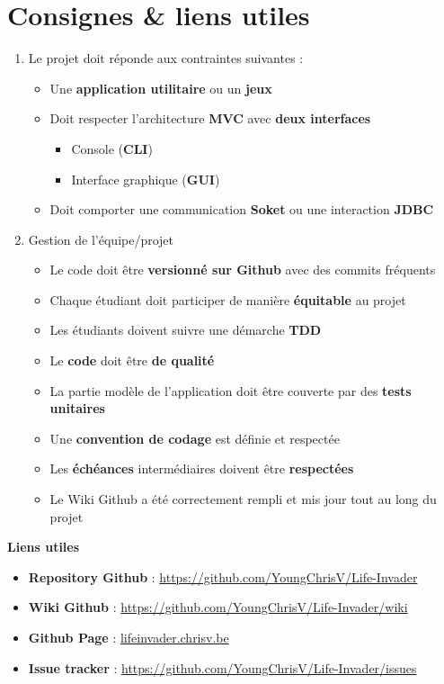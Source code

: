 \chapter*{Consignes \& liens utiles}
\label{chap:Consignes}

\begin{enumerate}[I]
    \item Le projet doit réponde aux contraintes suivantes :
    \begin{itemize}
        \item Une \textbf{application utilitaire} ou un \textbf{jeux}
        \item Doit respecter l'architecture \textbf{MVC} avec \textbf{deux interfaces}
        \begin{itemize}
            \item Console (\textbf{CLI})
            \item Interface graphique (\textbf{GUI})
        \end{itemize}
        \item Doit comporter une communication \textbf{Soket} ou une interaction \textbf{JDBC}
    \end{itemize}   
    \item Gestion de l'équipe/projet
    \begin{itemize}
        \item Le code doit être  \textbf{versionné sur Github} avec des commits fréquents
        \item Chaque étudiant doit participer de manière \textbf{équitable} au projet
        \item Les étudiants doivent suivre une démarche \textbf{TDD}
        \item Le \textbf{code} doit être \textbf{de qualité}
        \item La partie modèle de l'application doit être couverte par des \textbf{tests unitaires}
        \item Une \textbf{convention de codage} est définie et respectée
        \item Les \textbf{échéances} intermédiaires doivent être \textbf{respectées}
        \item Le Wiki Github a été correctement rempli et mis jour tout au long du projet
        \end{itemize}
\end{enumerate}

\textbf{Liens utiles}
\begin{itemize}
    \item \textbf{Repository Github} : \url{https://github.com/YoungChrisV/Life-Invader}
    \item \textbf{Wiki Github} : \url{https://github.com/YoungChrisV/Life-Invader/wiki}
    \item \textbf{Github Page} : \url{lifeinvader.chrisv.be}
    \item \textbf{Issue tracker} : \url{https://github.com/YoungChrisV/Life-Invader/issues}
\end{itemize}

\tableofcontents

\clearpage


